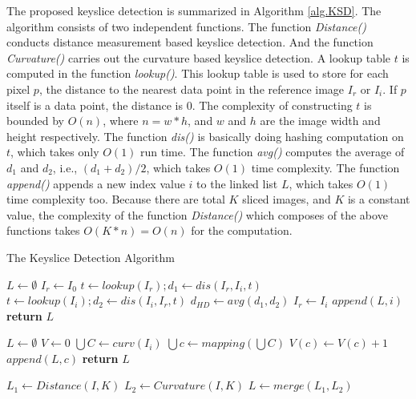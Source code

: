 The proposed keyslice detection is summarized in Algorithm \ref{alg.KSD}.
The algorithm consists of two independent functions.
The function {\it Distance()} conducts
distance measurement based keyslice detection.
And the function {\it Curvature()} carries out the
curvature based keyslice detection.
A lookup table $t$ is computed in the function {\it lookup()}.
This lookup table is used to store for each pixel $p$,
the distance to the nearest data point in the reference image $I_r$ or $I_i$.
If $p$ itself is a data point, the distance is 0.
The complexity of constructing $t$ is bounded by $O(n)$,
where $n = w * h$, and $w$ and $h$ are the image width and height respectively.
The function {\it dis()} is basically doing hashing computation on $t$,
which takes only $O(1)$ run time.
The function {\it avg()} computes the average of $d_1$ and $d_2$,
i.e., $(d_1 + d_2) / 2$, which takes $O(1)$ time complexity.
The function {\it append()} appends a new index value $i$
to the linked list $L$, which takes $O(1)$ time complexity too.
Because there are total $K$ sliced images, and $K$ is a constant value,
the complexity of the function {\it Distance()} which composes of
the above functions takes $O(K*n) = O(n) $ for the computation.

\begin{algorithm}
\caption{The Keyslice Detection Algorithm}
\label{alg.KSD}
\begin{algorithmic}[1]
  \State $L \leftarrow \emptyset$  
  \State $I_r \leftarrow I_0$
    \State $t \leftarrow lookup(I_r); d_1 \leftarrow dis(I_r, I_i, t) $
    \State $t \leftarrow lookup(I_i); d_2 \leftarrow dis(I_i, I_r, t) $
    \State $d_{HD} \leftarrow avg(d_1, d_2) $ 
       \State $I_r \leftarrow I_i$  
       \State $ append(L, i) $
    \EndIf
  \EndFor
  \State \textbf{return} $L$
\EndProcedure

  \State $L \leftarrow \emptyset$  
  \State $V \leftarrow 0$ 
     \State $\bigcup{C} \leftarrow curv(I_i)$ 
     \State $\bigcup{c} \leftarrow mapping(\bigcup{C}) $ 
        \State $V(c) \leftarrow V(c) + 1$ 
     \EndFor
  \EndFor
       
	\State $append(L, c)$
     \EndIf
  \EndFor
  \State \textbf{return} $L$
\EndProcedure

\State $L_1 \leftarrow Distance(I, K)$ 
\State $L_2 \leftarrow Curvature(I, K)$ 
\State $L \leftarrow merge(L_1, L_2)$
\EndProcedure
\end{algorithmic}
\end{algorithm}


